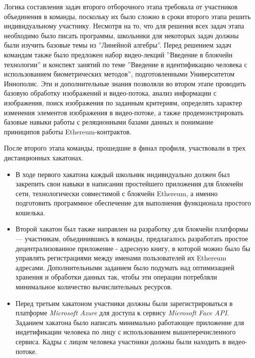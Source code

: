Логика составления задач второго отборочного этапа требовала от
участников объединения в команды, поскольку их было сложно в сроки
второго этапа решить индивидуальному участнику. Несмотря на то, что
для решения всех задач этапа необходимо было писать программы,
школьники для некоторых задач должны были изучить базовые темы из
''Линейной алгебры''. Перед решением задач командам также было
предложен набор видео-лекций ''Введение в блокчейн технологии'' и
конспект занятий по теме ''Введение в идентификацию человека с
использованием биометрических методов'', подготовленными Университетом
Иннополис. Эти и дополнительные знания позволяли во втором этапе
проводить базовую обработку изображений и видео-потока, анализ
информации с изображения, поиск изображения по заданным критериям,
определять характер изменения элементов изображения в видео-потоке, а
также продемонстрировать базовые навыки работы с реляционными базами
данных и понимание приниципов работы Ethereum-контрактов.

После второго этапа команды, прошедшие в финал профиля, участвовали в
трех дистанционных хакатонах.

\begin{itemize}
    \item В ходе первого хакатона каждый школьник индивидуально должен был
    закрепить свои навыки в написании простейшего приложения для блокчейн
    сети, технологически совместимой с блокчейн Ethereum, а именно
    подготовить программное обеспечение для выполнения функционала
    простого кошелька.
    
    \item Второй хакатон был также направлен на разработку для блокчейн
    платформы --- участникам, объединившись в команды, предлагалось
    разработать простое децентрализованное приложение - адресную книгу, в
    которой можно было бы управлять регистрациями между именами
    пользователей их Ethereum адресами. Дополнительными заданием было
    подумать над оптимизацией хранения и обработки данных так, чтобы эти
    операции потребляли минимальное количество вычислительных ресурсов.
    
    \item Перед третьим хакатоном участники должны были зарегистрироваться
    в платформе \textit{Microsoft Azure} для доступа к сервису
    \textit{Microsoft Face API}. Заданием хакатона было написать
    минимально работающее приложение для индетификации человека по лицу с
    использованием вышеперечисленного сервиса. Кадры с лицом человека
    участники должны были находить в видео-потоке.
    
\end{itemize}
    
